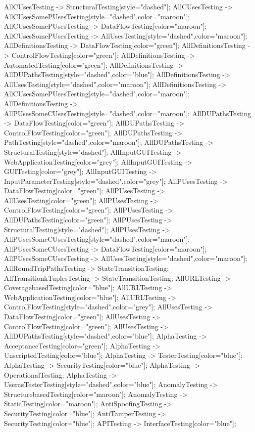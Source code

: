 \documentclass{article}
\begin{document}
{AllCUsesTesting -> StructuralTesting[style="dashed"];
AllCUsesTesting -> AllCUsesSomePUsesTesting[style="dashed",color="maroon"];
AllCUsesSomePUsesTesting -> DataFlowTesting[color="maroon"];
AllCUsesSomePUsesTesting -> AllUsesTesting[style="dashed",color="maroon"];
AllDefinitionsTesting -> DataFlowTesting[color="green"];
AllDefinitionsTesting -> ControlFlowTesting[color="green"];
AllDefinitionsTesting -> AutomatedTesting[color="green"];
AllDefinitionsTesting -> AllDUPathsTesting[style="dashed",color="blue"];
AllDefinitionsTesting -> AllUsesTesting[style="dashed",color="maroon"];
AllDefinitionsTesting -> AllCUsesSomePUsesTesting[style="dashed",color="maroon"];
AllDefinitionsTesting -> AllPUsesSomeCUsesTesting[style="dashed",color="maroon"];
AllDUPathsTesting -> DataFlowTesting[color="green"];
AllDUPathsTesting -> ControlFlowTesting[color="green"];
AllDUPathsTesting -> PathTesting[style="dashed",color="maroon"];
AllDUPathsTesting -> StructuralTesting[style="dashed"];
AllInputGUITesting -> WebApplicationTesting[color="grey"];
AllInputGUITesting -> GUITesting[color="grey"];
AllInputGUITesting -> InputParameterTesting[style="dashed",color="grey"];
AllPUsesTesting -> DataFlowTesting[color="green"];
AllPUsesTesting -> AllUsesTesting[color="green"];
AllPUsesTesting -> ControlFlowTesting[color="green"];
AllPUsesTesting -> AllDUPathsTesting[color="green"];
AllPUsesTesting -> StructuralTesting[style="dashed"];
AllPUsesTesting -> AllPUsesSomeCUsesTesting[style="dashed",color="maroon"];
AllPUsesSomeCUsesTesting -> DataFlowTesting[color="maroon"];
AllPUsesSomeCUsesTesting -> AllUsesTesting[style="dashed",color="maroon"];
AllRoundTripPathsTesting -> StateTransitionTesting;
AllTransitionkTuplesTesting -> StateTransitionTesting;
AllURLTesting -> CoveragebasedTesting[color="blue"];
AllURLTesting -> WebApplicationTesting[color="blue"];
AllURLTesting -> ControlFlowTesting[style="dashed",color="grey"];
AllUsesTesting -> DataFlowTesting[color="green"];
AllUsesTesting -> ControlFlowTesting[color="green"];
AllUsesTesting -> AllDUPathsTesting[style="dashed",color="blue"];
AlphaTesting -> AcceptanceTesting[color="green"];
AlphaTesting -> UnscriptedTesting[color="blue"];
AlphaTesting -> TesterTesting[color="blue"];
AlphaTesting -> SecurityTesting[color="blue"];
AlphaTesting -> OperationalTesting;
AlphaTesting -> UserasTesterTesting[style="dashed",color="blue"];
AnomalyTesting -> StructurebasedTesting[color="maroon"];
AnomalyTesting -> StaticTesting[color="maroon"];
AntiSpoofingTesting -> SecurityTesting[color="blue"];
AntiTamperTesting -> SecurityTesting[color="blue"];
APITesting -> InterfaceTesting[color="blue"];
}
\end{document}
